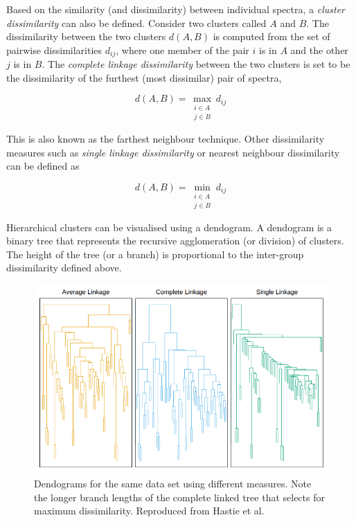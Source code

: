 Based on the similarity (and dissimilarity) between individual spectra, a \emph{cluster dissimilarity} can also be defined. Consider two clusters called $A$ and $B$. The dissimilarity between the two clusters $d(A,B)$ is computed from the set of pairwise dissimilarities $d_{ij}$, where one member of the pair $i$ is in $A$ and the other $j$ is in $B$. The \emph{complete linkage dissimilarity} between the two clusters is set to be the dissimilarity of the furthest (most dissimilar) pair of spectra,

\begin{equation}
    d(A,B) = \max_{\substack{i \in A \\ j \in B}} d_{ij}
\end{equation}

This is also known as the farthest neighbour technique. Other dissimilarity measures such as \emph{single linkage dissimilarity} or nearest neighbour dissimilarity can be defined as

\begin{equation}
    d(A,B) = \min_{\substack{i \in A \\ j \in B}} d_{ij}
\end{equation}

Hierarchical clusters can be visualised using a dendogram. A dendogram is a binary tree that represents the recursive agglomeration (or division) of clusters. The height of the tree (or a branch) is proportional to the inter-group dissimilarity defined above. 

\begin{figure}[!htb]
\centering
\includegraphics[scale=0.60]{figures/complete linkage.png}
\caption{Dendograms for the same data set using different measures. Note the longer branch lengths of the complete linked tree that selects for maximum dissimilarity. Reproduced from Hastie et al.\cite{hastie2009elements}}
\end{figure}

